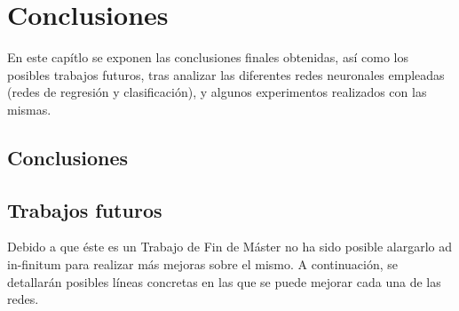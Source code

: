 \chapter{Conclusiones}\label{cap.conclusiones}

En este capítlo se exponen las conclusiones finales obtenidas, así como los posibles trabajos futuros, tras analizar las diferentes redes neuronales empleadas (redes de regresión y clasificación), y algunos experimentos realizados con las mismas.

\section{Conclusiones}

\section{Trabajos futuros}

Debido a que éste es un Trabajo de Fin de Máster no ha sido posible alargarlo ad in-finitum para realizar más mejoras sobre el mismo. A continuación, se detallarán posibles líneas concretas en las que se puede mejorar cada una de las redes.\\

